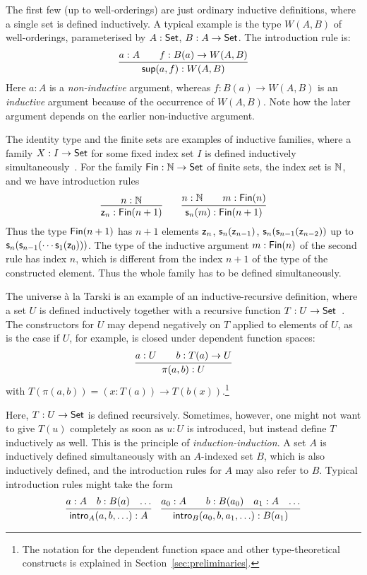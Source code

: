 \documentclass{article}
\begin{document}
The first few (up to well-orderings) are just ordinary inductive
definitions, where a single set is defined inductively. A typical
example is the type $W(A, B)$ of well-orderings, parameterised by $A :
\mathsf{Set}$, $B : A \to \mathsf{Set}$. The introduction rule is:
\[
\infer{\Wsup(a, f) : W(A, B)}{a : A & \quad f : B(a) \to W(A, B)}
\]
Here $a : A$ is a \emph{non-inductive} argument, whereas $f : B(a) \to
W(A, B)$ is an \emph{inductive} argument because of the occurrence of
$W(A, B)$. Note how the later argument depends on the earlier
non-inductive argument.

The identity type and the finite sets are examples
of inductive families, where a family $X : I \to \mathsf{Set}$ for some fixed
index set $I$ is defined inductively
simultaneously~\cite{dybjer1994indfam}. For the family $\mathsf{Fin} : \mathbb{N}
\to \mathsf{Set}$ of finite sets, the index set is $\mathbb{N}$, and we have
introduction rules
\[
\infer{\finzero{n} : \Fin(n + 1)}{n : \Nat} \qquad
\infer{\finsucc{n}{m} : \Fin(n + 1)}{n : \Nat & \quad m : \Fin(n)}
\]
Thus the type $\mathsf{Fin}(n+1)$ has $n + 1$ elements $\mathsf{z}_{n}$,
$\mathsf{s}_{n}(\mathsf{z}_{n-1})$,
$\mathsf{s}_{n}(\mathsf{s}_{n-1}(\mathsf{z}_{n-2}))$ up to
$\mathsf{s}_{n}(\mathsf{s}_{n-1}(\cdots\mathsf{s}_{1}(\mathsf{z}_{0})))$.
The type of the inductive argument $m : \mathsf{Fin}(n)$ of the second rule
has index $n$, which is different from the index $n + 1$ of the type
of the constructed element. Thus the whole family has to be defined
simultaneously.

The universe \`a la Tarski is an example of an inductive-recursive
definition, where a set $U$ is defined inductively together with a
recursive function $T : U \to \mathsf{Set}$~\cite{dybjer2000IR}.  The
constructors for $U$ may depend negatively on $T$ applied to elements
of $U$, as is the case if $U$, for example, is closed under dependent
function spaces:
\[
\infer{\pi(a, b) : U}{a : U & \quad b : T(a) \to U}
\]
with $T(\pi(a, b)) = (x : T(a)) \to T(b(x))$.\footnote{The notation
  for the dependent function space and other type-theoretical
  constructs is explained in Section~\ref{sec:preliminaries}.}

Here, $T : U \to \mathsf{Set}$ is defined recursively. Sometimes, however, one
might not want to give $T(u)$ completely as soon as $u : U$ is
introduced, but instead define $T$ inductively as well. This is the
principle of \emph{induction-induction}. A set $A$ is inductively
defined simultaneously with an $A$-indexed set $B$, which is also
inductively defined, and the introduction rules for $A$ may also refer
to $B$. Typical introduction rules might take the form
\[ \infer{\intro{A}(a, b, \ldots) : A}{a : A &b : B(a) & \ldots} \quad
\infer{\intro{B}(a_0, b, a_1, \ldots) : B(a_1)}{a_0 : A &
&b : B(a_0) & a_1 : A & \ldots} \]
\end{document}
